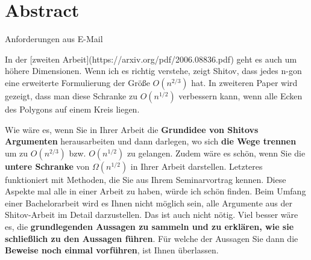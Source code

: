 \section*{Abstract}

{\large
  Anforderungen aus E-Mail
}

In der [zweiten Arbeit](https://arxiv.org/pdf/2006.08836.pdf) geht es auch um höhere Dimensionen. Wenn ich es richtig verstehe, zeigt Shitov, dass jedes n-gon eine erweiterte Formulierung der Größe $O(n^{2/3})$ hat. In zweiteren Paper wird gezeigt, dass man diese Schranke zu $O(n^{1/2})$ verbessern kann, wenn alle Ecken des Polygons auf einem Kreis liegen.

Wie wäre es, wenn Sie in Ihrer Arbeit die \textbf{Grundidee von Shitovs Argumenten} herausarbeiten und dann darlegen, wo sich \textbf{die Wege trennen} um zu $O(n^{2/3})$ bzw. $O(n^{1/2})$ zu gelangen. Zudem wäre es schön, wenn Sie die \textbf{untere Schranke} von $\Omega(n^{1/2})$ in Ihrer Arbeit darstellen. Letzteres funktioniert mit Methoden, die Sie aus Ihrem Seminarvortrag kennen. Diese Aspekte mal alle in einer Arbeit zu haben, würde ich schön finden. Beim Umfang einer Bachelorarbeit wird es Ihnen nicht möglich sein, alle Argumente aus der Shitov-Arbeit im Detail darzustellen. Das ist auch nicht nötig. Viel besser wäre es, die \textbf{grundlegenden Aussagen zu sammeln und zu erklären, wie sie schließlich zu den Aussagen führen}. Für welche der Aussagen Sie dann die \textbf{Beweise noch einmal vorführen}, ist Ihnen überlassen.
